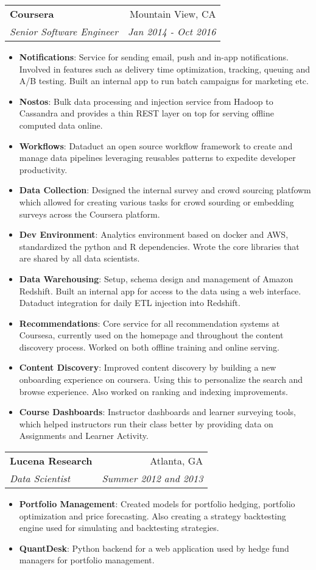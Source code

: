 \documentclass[letterpaper,11pt]{article}
\makeatletter
\newcommand{\resumeItem}[2]{
    \item\small{
        \textbf{#1}{: #2 \vspace{-2pt}}
    }
}
\newcommand{\resumeSubheading}[4]{
    \vspace{-1pt}\item
    \begin{tabular*}{0.97\textwidth}{l@{\extracolsep{\fill}}r}
    \textbf{#1} & #2 \\
    \textit{\small#3} & \textit{\small #4} \\
    \end{tabular*}\vspace{-5pt}
}
\newcommand{\resumeItemListStart}{\begin{itemize}}
\newcommand{\resumeItemListEnd}{\end{itemize}\vspace{-5pt}}
\makeatother
\begin{document}
    \resumeSubheading
    {Coursera}{Mountain View, CA}
    {Senior Software Engineer}{Jan 2014 - Oct 2016}
    \resumeItemListStart
    \resumeItem{Notifications}
    {Service for sending email, push and in-app notifications. Involved in features such as delivery time optimization, tracking, queuing and A/B testing. Built an internal app to run batch campaigns for marketing etc.}
    \resumeItem{Nostos}
    {Bulk data processing and injection service from Hadoop to Cassandra and provides a thin REST layer on top for serving offline computed data online.}
    \resumeItem{Workflows}
    {Dataduct an open source workflow framework to create and manage data pipelines leveraging reusables patterns to expedite developer productivity.}
    \resumeItem{Data Collection}
    {Designed the internal survey and crowd sourcing platfowm which allowed for creating various tasks for crowd sourding or embedding surveys across the Coursera platform.}
    \resumeItem{Dev Environment}
    {Analytics environment based on docker and AWS, standardized the python and R dependencies. Wrote the core libraries that are shared by all data scientists.}
    \resumeItem{Data Warehousing}
    {Setup, schema design and management of Amazon Redshift. Built an internal app for access to the data using a web interface. Dataduct integration for daily ETL injection into Redshift.}
    \resumeItem{Recommendations}
    {Core service for all recommendation systems at Coursesa, currently used on the homepage and throughout the content discovery process. Worked on both offline training and online serving.}
    \resumeItem{Content Discovery}
    {Improved content discovery by building a new onboarding experience on coursera. Using this to personalize the search and browse experience. Also worked on ranking and indexing improvements.}
    \resumeItem{Course Dashboards}
    {Instructor dashboards and learner surveying tools, which helped instructors run their class better by providing data on Assignments and Learner Activity.}
    \resumeItemListEnd

    \resumeSubheading
    {Lucena Research}{Atlanta, GA}
    {Data Scientist}{Summer 2012 and 2013}
    \resumeItemListStart
    \resumeItem{Portfolio Management}
    {Created models for portfolio hedging,  portfolio optimization and price forecasting. Also creating a strategy backtesting engine used for simulating and backtesting strategies.}
    \resumeItem{QuantDesk}
    {Python backend for a web application used by hedge fund managers for portfolio management.}
    \resumeItemListEnd
\end{document}
